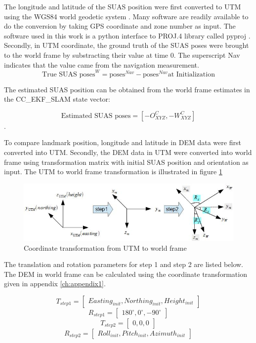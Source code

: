 The longitude and latitude of the SUAS position were first converted
to UTM using the WGS84 world geodetic system \cite{_world_????}. Many
software are readily available to do the conversion by taking GPS
coordinate and zone number as input. The software used in this work is
a python interface to PROJ.4 library \cite{_pyproj_????} called pyproj
\cite{_pyproj_????}. Secondly, in UTM coordinate, the ground truth of
the SUAS poses were brought to the world frame by substracting their
value at time 0. The superscript Nav indicates that the value came
from the navigation measurement.
$$\text{True SUAS poses}^W = \text{poses}^{Nav} - \text{poses}^{Nav} \text{at Initialization}$$ 

The estimated SUAS position can be obtained from the world
frame estimates in the CC\_EKF\_SLAM state vector:

$$ \text{Estimated SUAS poses} = 
[-O_{XYZ}^{C}, -W_{XYZ}^{C}]$$.


To compare landmark position, longitude and latitude in DEM data were
first converted into UTM. Secondly, the DEM data in UTM were converted
into world frame using transformation matrix with initial SUAS
position and orientation as input. The UTM to world frame
transformation is illustrated in figure \ref{fig:utm_to_world}

\begin{figure}[h]
  \centering
  \includegraphics[width=12cm,keepaspectratio=true]{./Figures/utm_to_world.jpg}
  \caption{Coordinate transformation from UTM to world frame}
  \label{fig:utm_to_world}
\end{figure}

\noindent The translation and rotation parameters for step 1 and step
2 are listed below. The DEM in world frame can be calculated using the
coordinate transformation given in appendix \ref{ch:appendix1}.

$$T_{step1} = \begin{bmatrix}Easting_{init}, Northing_{init},
  Height_{init}\end{bmatrix}$$
$$R_{step1} = \begin{bmatrix}180^{\circ}, 0^{\circ},
  -90^{\circ}\end{bmatrix}$$
$$T_{step2} = \begin{bmatrix}0, 0, 0\end{bmatrix}$$
$$R_{step2} = \begin{bmatrix}Roll_{init}, Pitch_{init},
  Azimuth_{init}\end{bmatrix}$$

